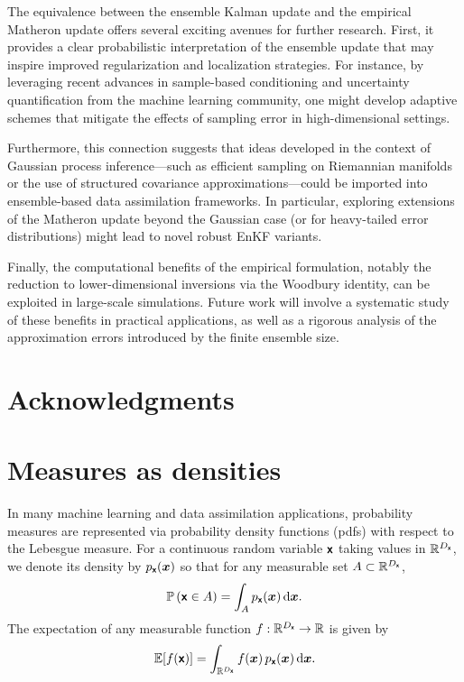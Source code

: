 \documentclass[wcp]{jmlr} %
\begin{document}
The equivalence between the ensemble Kalman update and the empirical Matheron update offers several exciting avenues for further research. First, it provides a clear probabilistic interpretation of the ensemble update that may inspire improved regularization and localization strategies. For instance, by leveraging recent advances in sample-based conditioning and uncertainty quantification from the machine learning community, one might develop adaptive schemes that mitigate the effects of sampling error in high-dimensional settings.

Furthermore, this connection suggests that ideas developed in the context of Gaussian process inference—such as efficient sampling on Riemannian manifolds or the use of structured covariance approximations—could be imported into ensemble-based data assimilation frameworks. In particular, exploring extensions of the Matheron update beyond the Gaussian case (or for heavy-tailed error distributions) might lead to novel robust EnKF variants.

Finally, the computational benefits of the empirical formulation, notably the reduction to lower-dimensional inversions via the Woodbury identity, can be exploited in large-scale simulations. Future work will involve a systematic study of these benefits in practical applications, as well as a rigorous analysis of the approximation errors introduced by the finite ensemble size.

\section*{Acknowledgments}




\appendix

\section{Measures as densities}\label{sec:densities-please}

In many machine learning and data assimilation applications, probability measures are represented via probability density functions (pdfs) with respect to the Lebesgue measure. For a continuous random variable \(\boldsymbol{\mathsf{x}}\) taking values in \(\mathbb{R}^{D_{\boldsymbol{\mathsf{x}}}}\), we denote its density by \(p_{\boldsymbol{\mathsf{x}}}(\boldsymbol{x})\) so that for any measurable set \(A \subset \mathbb{R}^{D_{\boldsymbol{\mathsf{x}}}}\),
\begin{equation}
    \mathbb{P}\left(\boldsymbol{\mathsf{x}} \in A\right)
    = \int_A p_{\boldsymbol{\mathsf{x}}}(\boldsymbol{x})\,\mathrm{d}\boldsymbol{x}.
\end{equation}
The expectation of any measurable function \(f:\mathbb{R}^{D_{\boldsymbol{\mathsf{x}}}}\to\mathbb{R}\) is given by
\begin{equation}
    \mathbb{E}[f(\boldsymbol{\mathsf{x}})] = \int_{\mathbb{R}^{D_{\boldsymbol{\mathsf{x}}}}} f(\boldsymbol{x})\,p_{\boldsymbol{\mathsf{x}}}(\boldsymbol{x})\,\mathrm{d}\boldsymbol{x}.
\end{equation}
\end{document}
